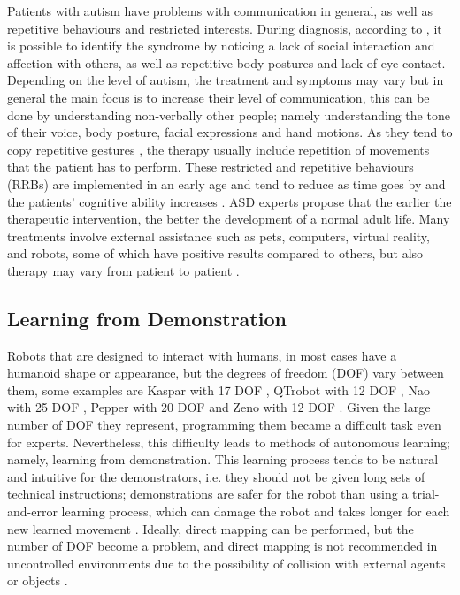 \documentclass[thesis]{mas_proposal}
\begin{document}
    Patients with autism have problems with communication in general, as well as repetitive behaviours and restricted interests. During diagnosis, according to \cite{Brentani2013}, it is possible to identify the syndrome by noticing a lack of social interaction and affection with others, as well as repetitive body postures and lack of eye contact.  Depending on the level of autism, the treatment and symptoms may vary but in general the main focus is to increase their level of communication, this can be done by understanding non-verbally other people; namely understanding the tone of their voice, body posture, facial expressions and hand motions. As they tend to copy repetitive gestures \cite{Dautenhahn2004}, the therapy usually include repetition of movements that the patient has to perform. These restricted and repetitive behaviours (RRBs) are implemented in an early age and tend to reduce as time goes by and the patients' cognitive ability increases \cite{Leekam2011}. ASD experts propose that the earlier the therapeutic intervention, the better the development of a normal adult life. Many treatments involve external assistance such as pets, computers, virtual reality, and robots, some of which have positive results compared to others, but also therapy may vary from patient to patient \cite{Scassellati2012}.
    
    \subsection{Learning from Demonstration}
    
    Robots that are designed to interact with humans, in most cases have a humanoid shape or appearance, but the degrees of freedom (DOF) vary between them, some examples are Kaspar with 17 DOF \cite{Kaspar2023}, QTrobot with 12 DOF \cite{qtrobot_safety_manual}, Nao with 25 DOF \cite{softbankrobotics}, Pepper with 20 DOF \cite{softbankrobotics} and Zeno with 12 DOF \cite{Papakostas2021}. Given the large number of DOF they represent, programming them became a difficult task even for experts. Nevertheless, this difficulty leads to methods of autonomous learning; namely, learning from demonstration. This learning process tends to be natural and intuitive for the demonstrators, i.e. they should not be given long sets of technical instructions; demonstrations are safer for the robot than using a trial-and-error learning process, which can damage the robot and takes longer for each new learned movement \cite{Bandera2012}. Ideally, direct mapping can be performed, but the number of DOF become a problem, and direct mapping is not recommended in uncontrolled environments due to the possibility of collision with external agents or objects \cite{Bentivegna2004}.
    
\end{document}
